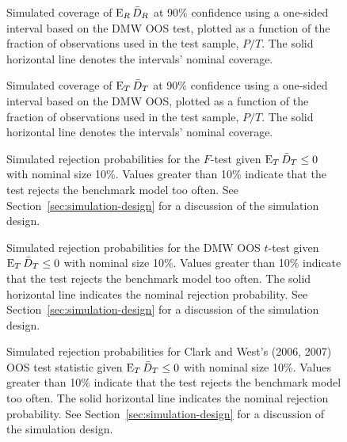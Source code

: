 \documentclass[11pt]{article}
\begin{document}
\clearpage
\begin{figure}
\caption{Simulated coverage of $\operatorname{E}_R \bar{D}_{R}$ at 90\% confidence using a
  one-sided interval based on the DMW
  OOS test, plotted as a function of the fraction of
  observations used in the test sample, $P/T$.  The solid horizontal
  line denotes the intervals' nominal coverage.}
 \label{fig:interval-R}
\end{figure}
\clearpage
\begin{figure}
\caption{Simulated coverage of $\operatorname{E}_T \bar{D}_{T}$ at 90\% confidence using a
  one-sided interval based on the DMW
  OOS, plotted as a function of the fraction of
  observations used in the test sample, $P/T$.  The solid horizontal
  line denotes the intervals' nominal coverage.}
\label{fig:interval-T}
\end{figure}
\clearpage

\begin{figure}
  
  \caption{Simulated rejection probabilities for the $F$-test given
    $\operatorname{E}_T \bar{D}_{T} \leq 0$ with nominal size 10\%.  Values greater than
    10\% indicate that the test rejects the benchmark model too often.
    See Section~\ref{sec:simulation-design} for a discussion of the
    simulation design.}
  \label{fig:ftest}
\end{figure}
\clearpage
\begin{figure}
  \caption{Simulated rejection probabilities for the DMW
    OOS $t$-test given $\operatorname{E}_T \bar{D}_{T} \leq 0$ with nominal
    size 10\%.  Values greater than 10\% indicate that the test
    rejects the benchmark model too often.  The solid horizontal line
    indicates the nominal rejection probability.  See
    Section~\ref{sec:simulation-design} for a discussion of the
    simulation design.}
  \label{fig:ttest-size}
\end{figure}

\begin{figure}
  
  \caption{Simulated rejection probabilities for Clark and West's
    (2006, 2007) OOS test statistic given $\operatorname{E}_T \bar{D}_{T}
    \leq 0$ with nominal size 10\%.  Values greater than 10\% indicate
    that the test rejects the benchmark model too often.  The solid
    horizontal line indicates the nominal rejection probability.  See
    Section~\ref{sec:simulation-design} for a discussion of the
    simulation design.}
   \label{fig:clarkwest}
\end{figure}
\end{document}
